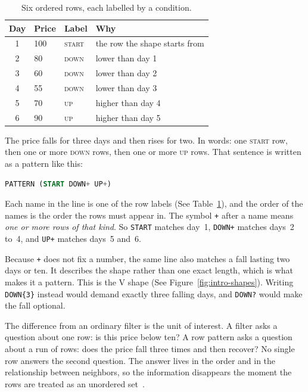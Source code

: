 \begin{table}[H]
\centering
\caption{Six ordered rows, each labelled by a condition.}
\label{tab:intro-rowlabels}
{\small
\begin{tabular}{clll}
\toprule
\textbf{Day} & \textbf{Price} & \textbf{Label} & \textbf{Why} \\
\midrule
1 & 100 & \textsc{start} & the row the shape starts from \\
2 &  80 & \textsc{down}  & lower than day 1 \\
3 &  60 & \textsc{down}  & lower than day 2 \\
4 &  55 & \textsc{down}  & lower than day 3 \\
5 &  70 & \textsc{up}    & higher than day 4 \\
6 &  90 & \textsc{up}    & higher than day 5 \\
\bottomrule
\end{tabular}
}
\end{table}

\noindent
The price falls for three days and then rises for two.  In words: one
\textsc{start} row, then one or more \textsc{down} rows, then one or more
\textsc{up} rows.  That sentence is written as a pattern like this:

\begin{lstlisting}[language=SQL]
PATTERN (START DOWN+ UP+)
\end{lstlisting}

Each name in the line is one of the row labels (See
Table~\ref{tab:intro-rowlabels}), and the order of the names is the order
the rows must appear in.  The symbol
\texttt{+} after a name means \emph{one or more rows of that kind}.  So
\texttt{START} matches day~1, \texttt{DOWN+} matches days~2 to~4, and
\texttt{UP+} matches days~5 and~6.

Because \texttt{+} does not fix a number, the same line also matches a fall
lasting two days or ten.  It describes the shape rather than one exact
length, which is what makes it a pattern.  This is the V shape (See
Figure~\ref{fig:intro-shapes}).  Writing \texttt{DOWN\{3\}} instead would
demand exactly three falling days, and \texttt{DOWN?} would make the fall
optional.

The difference from an ordinary filter is the unit of interest.  A filter
asks a question about one row: is this price below ten?  A row pattern asks
a question about a run of rows: does the price fall three times and then
recover?  No single row answers the second question.  The answer lives in
the order and in the relationship between neighbors, so the information
disappears the moment the rows are treated as an unordered
set~\cite{melton2017sqlrpr}.

